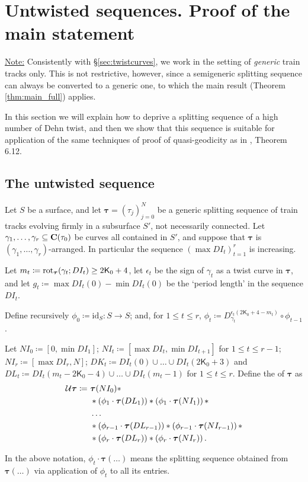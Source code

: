 \section{Untwisted sequences. Proof of the main statement}\label{sec:traintrackconclusion}

\ul{Note:} Consistently with \S \ref{sec:twistcurves}, we work in the setting of \emph{generic} train tracks only. This is not restrictive, however, since a semigeneric splitting sequence can always be converted to a generic one, to which the main result (Theorem \ref{thm:main_full}) applies.

In this section we will explain how to deprive a splitting sequence of a high number of Dehn twist, and then we show that this sequence is suitable for application of the same techniques of proof of quasi-geodicity as in \cite{mms}, Theorem 6.12.

\subsection{The untwisted sequence}\label{sub:untwistedsequence}
\begin{defin}\label{def:untwistedsequence}
Let $S$ be a surface, and let $\bm\tau=(\tau_j)_{j=0}^N$ be a generic splitting sequence of train tracks evolving firmly in a subsurface $S'$, not necessarily connected. Let $\gamma_1,\ldots,\gamma_r\subseteq \mathbf C(\tau_0)$ be curves all contained in $S'$, and suppose that $\bm\tau$ is $(\gamma_1,\ldots,\gamma_r)$-arranged. In particular the sequence $(\max DI_t)_{t=1}^r$ is increasing.

Let $m_t\coloneqq \mathrm{rot}_{\bm\tau}(\gamma_t;DI_t)\geq 2\mathsf{K}_0+4$, let $\epsilon_t$ be the sign of $\gamma_t$ as a twist curve in $\bm\tau$, and let $g_t\coloneqq \max DI_t(0)-\min DI_t(0)$ be the `period length' in the sequence $DI_t$.

Define recursively $\phi_0\coloneqq \mathrm{id}_S:S\rightarrow S$; and, for $1\leq t \leq r$, $\phi_t\coloneqq D_{\gamma_t}^{\epsilon_t(2\mathsf{K}_0+4-m_t)}\circ \phi_{t-1}$.

Let $NI_0\coloneqq[0,\min DI_1]$; $NI_t\coloneqq [\max DI_t,\min DI_{t+1}]$ for $1\leq t\leq r-1$; $NI_r\coloneqq [\max DI_r,N]$; $DK_t\coloneqq DI_t(0)\cup \ldots \cup DI_t(2\mathsf{K}_0+3)$ and $DL_t\coloneqq DI_t(m_t-2\mathsf{K}_0-4)\cup \ldots \cup DI_t(m_t-1)$ for $1\leq t\leq r$. Define the  of $\bm\tau$ as
\begin{align*}
{\mathcal U}\bm\tau \coloneqq\  & \bm\tau(NI_0)*\\
 &  * \left(\phi_1\cdot \bm\tau(DL_1)\right) * \left(\phi_1\cdot\bm\tau(NI_1)\right) *\\
 & \ldots  \\
 & * \left(\phi_{r-1}\cdot\bm\tau(DL_{r-1})\right) * \left(\phi_{r-1}\cdot\bm\tau(NI_{r-1})\right) * \\
 & * \left(\phi_r\cdot\bm\tau(DL_r)\right) * \left(\phi_r\cdot\bm\tau(NI_r)\right).
\end{align*}

In the above notation, $\phi_t\cdot \bm\tau(\ldots)$ means the splitting sequence obtained from $\bm\tau(\ldots)$ via application of $\phi_t$ to all its entries.
\end{defin}

